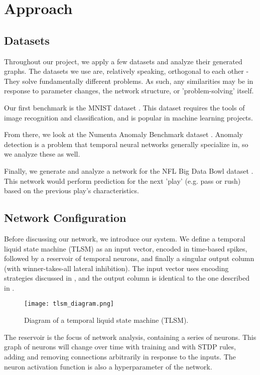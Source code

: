 \section{Approach} \label{sec:Approach}

\subsection{Datasets}

Throughout our project, we apply a few datasets and analyze their generated
graphs. The datasets we use are, relatively speaking, orthogonal to each other -
They solve fundamentally different problems. As such, any similarities may be in
response to parameter changes, the network structure, or 'problem-solving'
itself.

Our first benchmark is the MNIST dataset \cite{MNIST Dataset}. This dataset
requires the tools of image recognition and classification, and is popular in
machine learning projects.

From there, we look at the Numenta Anomaly Benchmark dataset \cite{NAB Dataset}.
Anomaly detection is a problem that temporal neural networks generally
specialize in, so we analyze these as well.

Finally, we generate and analyze a network for the NFL Big Data Bowl dataset
\cite{NFL Dataset}. This network would perform prediction for the next 'play'
(e.g. pass or rush) based on the previous play's characteristics.

\subsection{Network Configuration}

Before discussing our network, we introduce our system. We define a temporal
liquid state machine (TLSM) as an input vector, encoded in time-based spikes,
followed by a reservoir of temporal neurons, and finally a singular output
column (with winner-takes-all lateral inhibition). The input vector uses
encoding strategies discussed in \cite{Encoding}, and the output column is
identical to the one described in \cite{TNN}.

\begin{figure}[h]
    \centering
    \texttt{[image: tlsm\_diagram.png]}
    \caption{Diagram of a temporal liquid state machine (TLSM).}
    \label{fig:tlsm_diagram}
\end{figure}

The reservoir is the focus of network analysis, containing a series of neurons.
This graph of neurons will change over time with training and with STDP rules,
adding and removing connections arbitrarily in response to the inputs. The
neuron activation function is also a hyperparameter of the network.

